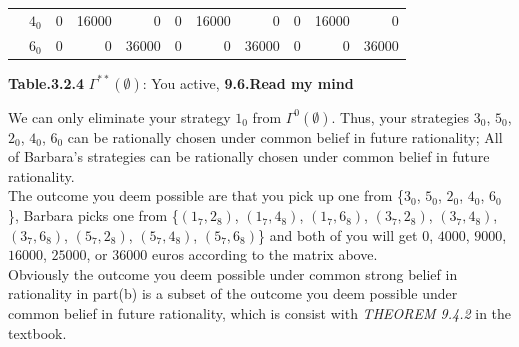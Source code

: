 \documentclass{article}
\begin{document}
\begin{description}
\begin{center}
\begin{tabular}{rrrrrrrrrrr}
        \multicolumn{ 1}{c}{{\bf }} &        $4_0$ &          0 &      16000 &          0 &          0 &      16000 &          0 &          0 &      16000 &          0 \\

        \multicolumn{ 1}{c}{{\bf }} &        $6_0$ &          0 &          0 &      36000 &          0 &          0 &      36000 &          0 &          0 &      36000 \\
        \hline
        \hline
        \end{tabular}

        {\bf Table.3.2.4 }$\Gamma ^{**}(\emptyset )$: You active, {\bf 9.6.Read my mind}
    \end{center}
    We can only eliminate your strategy $1_0$ from $\Gamma ^{0}(\emptyset )$. Thus, your strategies $3_0$, $5_0$, $2_0$, $4_0$, $6_0$ can be rationally chosen under common belief in future rationality; All of Barbara's strategies can be rationally chosen under common belief in future rationality.\\
    The outcome you deem possible are that you pick up one from \{$3_0$, $5_0$, $2_0$, $4_0$, $6_0$\}, Barbara picks one from \{$(1_7,2_8)$, $(1_7,4_8)$, $(1_7,6_8)$, $(3_7,2_8)$, $(3_7,4_8)$, $(3_7,6_8)$, $(5_7,2_8)$, $(5_7,4_8)$, $(5_7,6_8)$\}  and both of you will get $0$, $4000$, $9000$, $16000$, $25000$, or $36000$ euros according to the matrix above.\\
    Obviously the outcome you deem possible under common strong belief in rationality in part(b) is a subset of the outcome you deem possible under common belief in future rationality, which is consist with {\it THEOREM 9.4.2} in the textbook.
\end{description}
\end{document}
